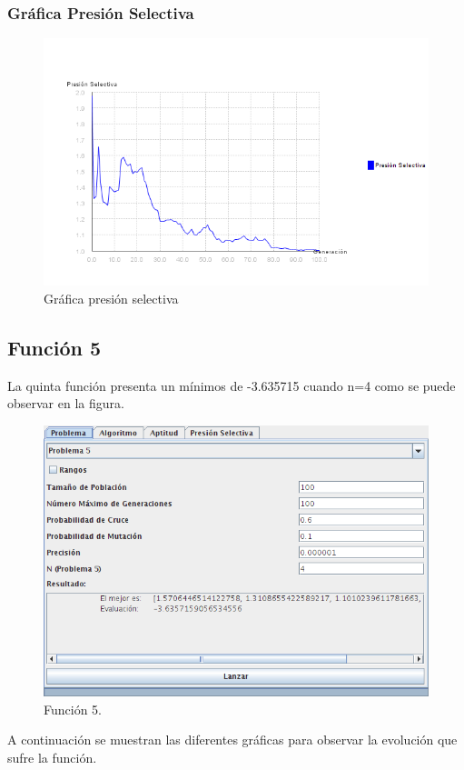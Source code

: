 \documentclass[12pt]{article}
\begin{document}
\subsubsection*{Gráfica Presión Selectiva}
\begin{figure}[H]
\centering
\includegraphics[scale=0.5]{graficas/F4inicial_presion}
\caption{Gráfica presión selectiva}
\label{fig}
\end{figure}
\newpage

\subsection{Función 5}
	La quinta función presenta un mínimos de -3.635715 cuando n=4 como se puede observar en la figura.
\begin{figure}[H]
\centering
\includegraphics[scale=0.5]{graficas/F5inicial}
\caption{Función 5.}
\label{fig}
\end{figure}
	A continuación se muestran las diferentes gráficas para observar la evolución que sufre la función.
\end{document}
